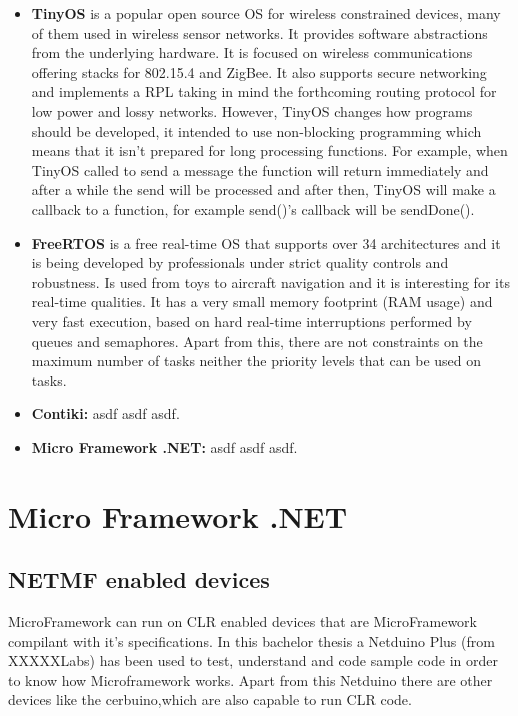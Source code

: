 \begin{itemize}
\item \textbf{TinyOS} is a popular open source OS for wireless constrained devices, many of them used in wireless sensor networks. It provides software abstractions from the underlying hardware. It is focused on wireless communications offering stacks for 802.15.4 and ZigBee. It also supports secure networking and implements a RPL taking in mind the forthcoming routing protocol for low power and lossy networks.
However, TinyOS changes how programs should be developed, it intended to use non-blocking programming which means that it isn't prepared for long processing functions. For example, when TinyOS called to send a message the function will return immediately and after a while the send will be processed and after then, TinyOS will make a callback to a function, for example send()'s callback will be sendDone().

\item \textbf{FreeRTOS} is a free real-time OS that supports over 34 architectures and it is being developed by professionals under strict quality controls and robustness. Is used from toys to aircraft navigation and it is interesting for its real-time qualities. It has a very small memory footprint (RAM usage) and very fast execution, based on hard real-time interruptions performed by queues and semaphores. Apart from this, there are not constraints on the maximum number of tasks neither the priority levels that can be used on tasks. 

\item \textbf{Contiki:} asdf asdf asdf.

\item \textbf{Micro Framework .NET:} asdf asdf asdf.
\end{itemize}



\section{Micro Framework .NET}\label{S:MicroFramework}


\subsection{NETMF enabled devices}\label{SS:MicroFramework-Devices}

MicroFramework can run on CLR enabled devices that are MicroFramework compilant with it's specifications. In this bachelor thesis a Netduino Plus (from XXXXXLabs) has been used to test, understand and code sample code in order to know how Microframework works. Apart from this Netduino there are other devices like the cerbuino,which are also capable to run CLR code.

